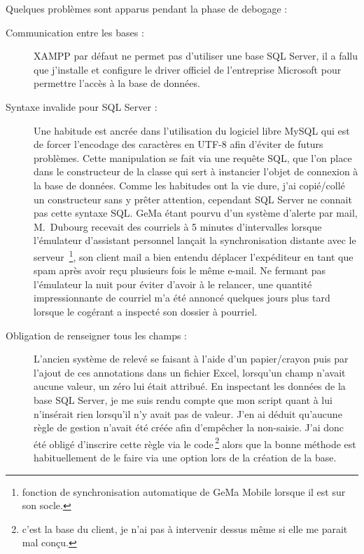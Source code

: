 Quelques problèmes sont apparus pendant la phase de debogage :
\begin{description}

  \item[Communication entre les bases :] XAMPP par défaut ne permet pas
    d'utiliser une base SQL Server, il a fallu que j'installe et
    configure le driver officiel de l'entreprise Microsoft pour
    permettre l'accès à la base de données.

  \item[Syntaxe invalide pour SQL Server :] Une habitude est ancrée dans
    l'utilisation du logiciel libre MySQL qui est de forcer l'encodage
    des caractères en UTF-8 afin d'éviter de futurs problèmes.  Cette
    manipulation se fait via une requête SQL, que l'on place dans le
    constructeur de la classe qui sert à instancier l'objet de connexion
    à la base de données. Comme les habitudes ont la vie dure, j'ai
    copié/collé un constructeur sans y prêter attention, cependant SQL
    Server ne connait pas cette syntaxe SQL. GeMa étant pourvu d'un
    système d'alerte par mail, M.~Dubourg recevait des courriels à 5
    minutes d'intervalles lorsque l'émulateur d'assistant personnel
    lançait la synchronisation distante avec le serveur\,
    \footnote{fonction de synchronisation automatique de GeMa Mobile
    lorsque il est sur son socle.}, son client mail a bien entendu
    déplacer l'expéditeur en tant que spam après avoir reçu plusieurs
    fois le même e-mail.  Ne fermant pas l'émulateur la nuit pour éviter
    d'avoir à le relancer, une quantité impressionnante de courriel m'a
    été annoncé quelques jours plus tard lorsque le cogérant a inspecté
    son dossier à pourriel.

  \item[Obligation de renseigner tous les champs :] L'ancien système de
    relevé se faisant à l'aide d'un papier/crayon puis par l'ajout de
    ces annotations dans un fichier Excel, lorsqu'un champ n'avait
    aucune valeur, un zéro lui était attribué. En inspectant les données
    de la base SQL Server, je me suis rendu compte que mon script quant
    à lui n'insérait rien lorsqu'il n'y avait pas de valeur. J'en ai
    déduit qu'aucune règle de gestion n'avait été créée afin d'empêcher
    la non-saisie. J'ai donc été obligé d'inscrire cette règle via le
    code\,\footnote{c'est la base du client, je n'ai pas à intervenir
    dessus même si elle me parait mal conçu.} alors que la bonne méthode
    est habituellement de le faire via une option lors de la création de
    la base.

\end{description}
